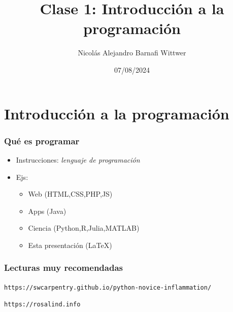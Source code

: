 \documentclass[14pt,aspectratio=169,xcolor=dvipsnames]{beamer}
\title[short title]{Clase 1: Introducción a la programación}
\subtitle{}
\author[NA Barnafi] {Nicolás Alejandro Barnafi Wittwer}
\institute[UC|CMM] 
{
    Pontificia Universidad Católica de Chile \\
    Centro de Modelamiento Matemático
}
\date{07/08/2024}
\begin{document}
\begin{frame}
    \maketitle
\end{frame}
\section{Introducción a la programación}
\begin{frame}[t]\frametitle{Qué es programar}

\begin{itemize}
    \item Instrucciones: \emph{lenguaje de programación}
    \item Ejs: 
        \begin{itemize}
            \item Web (HTML,CSS,PHP,JS)
            \item Apps (Java)
            \item {Ciencia (Python,R,Julia,MATLAB)}
            \item Esta presentación (\LaTeX)
        \end{itemize}
\end{itemize}

\vspace{1cm}
\pause {}
\end{frame}
\begin{frame}\frametitle{Lecturas muy recomendadas}
\texttt{https://swcarpentry.github.io/python-novice-inflammation/}

\texttt{https://rosalind.info}
\end{frame}
\end{document}
